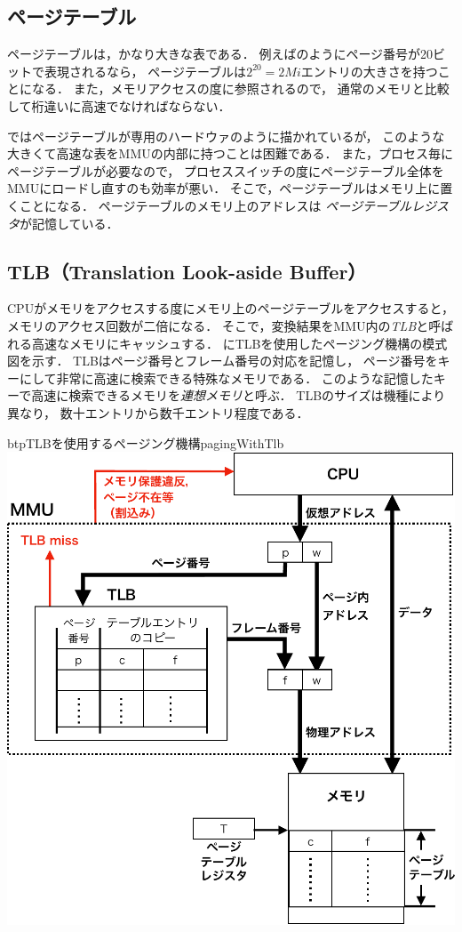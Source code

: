 \subsection{ページテーブル}
ページテーブルは，かなり大きな表である．
例えばのようにページ番号が20ビットで表現されるなら，
ページテーブルは$2^{20}=2Mi$エントリの大きさを持つことになる．
また，メモリアクセスの度に参照されるので，
通常のメモリと比較して桁違いに高速でなければならない．

ではページテーブルが専用のハードウァのように描かれているが，
このような大きくて高速な表をMMUの内部に持つことは困難である．
また，プロセス毎にページテーブルが必要なので，
プロセススイッチの度にページテーブル全体をMMUにロードし直すのも効率が悪い．
そこで，ページテーブルはメモリ上に置くことになる．
ページテーブルのメモリ上のアドレスは
\emph{ページテーブルレジスタ}が記憶している．

\subsection{TLB（Translation Look-aside Buffer）}
CPUがメモリをアクセスする度にメモリ上のページテーブルをアクセスすると，
メモリのアクセス回数が二倍になる．
そこで，変換結果をMMU内の\emph{TLB}と呼ばれる高速なメモリにキャッシュする．
にTLBを使用したページング機構の模式図を示す．
TLBはページ番号とフレーム番号の対応を記憶し，
ページ番号をキーにして非常に高速に検索できる特殊なメモリである．
このような記憶したキーで高速に検索できるメモリを\emph{連想メモリ}と呼ぶ．
TLBのサイズは機種により異なり，
数十エントリから数千エントリ程度である．

\begin{myfig}{btp}{TLBを使用するページング機構}{pagingWithTlb}
  \includegraphics[scale=0.66]{Fig/pagingWithTlb-crop.pdf}
\end{myfig}

